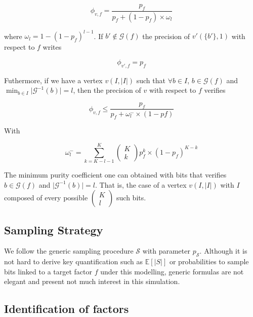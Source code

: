 \documentclass[a4paper, 11pt]{article}
\begin{document}
\begin{equation*}
\phi_{v, f} = \frac{p_f}{p_f + (1 - p_f)\times \omega_{l}}
\end{equation*}

where $\omega_l = 1 - (1-p_f)^{l-1}$. If $b' \notin \mathcal{G}(f)$ the precision of $v'(\{ b' \}, 1)$ with respect to $f$ writes

\begin{equation*}
\phi_{v', f} = p_f
\end{equation*}

Futhermore, if we have a vertex $v(I, \vert I \vert)$ such that $\forall b \in I$, $b \in \mathcal{G}(f)$ and $\min_{b \in I} \vert \mathcal{G}^{-1}(b) \vert = l$, then the precision of $v$ with respect to $f$ verifies

\begin{equation*}
\phi_{v, f} \leq \frac{p_f}{p_f + \omega^{-}_l \times (1 - pf)}
\end{equation*}

With 

\begin{equation*}
\omega^{-}_l = \sum_{k=K-l-1}^{K} \begin{pmatrix} K \\ k \end{pmatrix} p_f^{k} \times (1-p_f)^{K - k}
\end{equation*}

The minimum purity coefficient one can obtained with bits that verifies $b \in \mathcal{G}(f)$ and $\vert \mathcal{G}^{-1}(b) \vert = l$. That is, the case of a vertex $v(I, \vert I \vert)$ with $I$ composed of every possible $\begin{pmatrix} K \\ l \end{pmatrix}$ such bits.


\subsection{Sampling Strategy}

We follow the generic sampling procedure $\mathcal{S}$ with parameter $p_{\mathcal{S}}$. Although it is not hard to derive key quantification such as $\mathbb{E}\left[ \vert S \vert \right]$ or probabilities to sample bits linked to a target factor $f$ under this modelling, generic formulas are not elegant and present not much interest in this simulation.
 
\subsection{Identification of factors}
\end{document}
